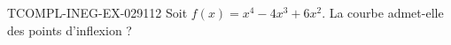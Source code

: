 \begin{exercice}{TCOMPL-INEG-EX-029}{1}{12}
Soit $f(x) = x^4 - 4x^3 + 6x^2$. La courbe admet-elle des points d'inflexion ?

\end{exercice}
